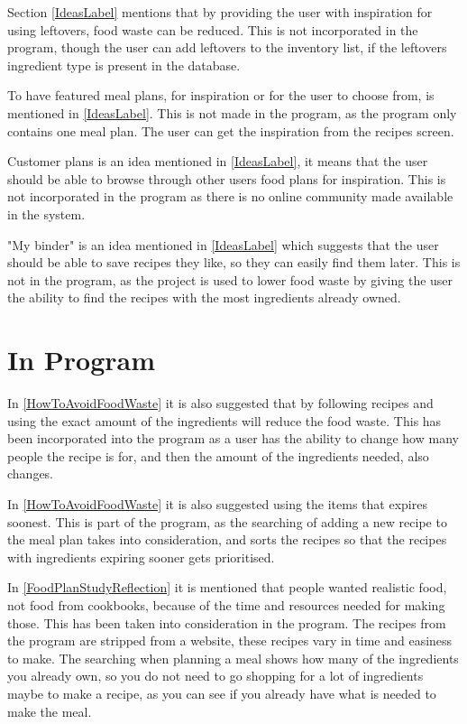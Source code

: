 Section \ref{IdeasLabel} mentions that by providing the user with inspiration for using leftovers, food waste can be reduced. This is not incorporated in the program, though the user can add leftovers to the inventory list, if the leftovers ingredient type is present in the database.

To have featured meal plans, for inspiration or for the user to choose from, is mentioned in \cref{IdeasLabel}. This is not made in the program, as the program only contains one meal plan. The user can get the inspiration from the recipes screen.

Customer plans is an idea mentioned in \cref{IdeasLabel}, it means that the user should be able to browse through other users food plans for inspiration. This is not incorporated in the program as there is no online community made available in the system.

"My binder" is an idea mentioned in \cref{IdeasLabel} which suggests that the user should be able to save recipes they like, so they can easily find them later. This is not in the program, as the project is used to lower food waste by giving the user the ability to find the recipes with the most ingredients already owned.

\section{In Program}

In \cref{HowToAvoidFoodWaste} it is also suggested that by following recipes and using the exact amount of the ingredients will reduce the food waste. This has been incorporated into the program as a user has the ability to change how many people the recipe is for, and then the amount of the ingredients needed, also changes.

In \cref{HowToAvoidFoodWaste} it is also suggested using the items that expires soonest. This is part of the program, as the searching of adding a new recipe to the meal plan takes into consideration, and sorts the recipes so that the recipes with ingredients expiring sooner gets prioritised.

In \cref{FoodPlanStudyReflection} it is mentioned that people wanted realistic food, not food from cookbooks, because of the time and resources needed for making those. This has been taken into consideration in the program. The recipes from the program are stripped from a website, these recipes vary in time and easiness to make. The searching when planning a meal shows how many of the ingredients you already own, so you do not need to go shopping for a lot of ingredients maybe to make a recipe, as you can see if you already have what is needed to make the meal.

